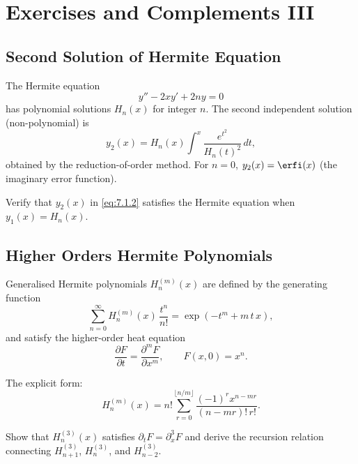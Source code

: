\chapter{Exercises and Complements III}

\section{Second Solution of Hermite Equation}

The Hermite equation
\begin{equation}
y'' - 2xy' + 2ny = 0
\label{eq:7.1.1}
\end{equation}
has polynomial solutions $H_n(x)$ for integer $n$. The second independent
solution (non-polynomial) is
\begin{equation}
y_2(x) = H_n(x)\int^x \frac{e^{t^2}}{H_n(t)^2}\,dt,
\label{eq:7.1.2}
\end{equation}
obtained by the reduction-of-order method. For $n=0$,
$y_2(x)=\erfi(x)$ (the imaginary error function).

\begin{exercise}
Verify that $y_2(x)$ in \eqref{eq:7.1.2} satisfies the Hermite equation
when $y_1(x)=H_n(x)$.
\end{exercise}

\section{Higher Orders Hermite Polynomials}

Generalised Hermite polynomials $H_n^{(m)}(x)$ are defined by the generating
function
\begin{equation}
\sum_{n=0}^{\infty} H_n^{(m)}(x)\,\frac{t^n}{n!}
= \exp\!\left(-t^m + m\,t\,x\right),
\label{eq:7.2.1}
\end{equation}
and satisfy the higher-order heat equation
\begin{equation}
\frac{\partial F}{\partial t} = \frac{\partial^m F}{\partial x^m},
\qquad F(x,0)=x^n.
\label{eq:7.2.2}
\end{equation}

The explicit form:
\begin{equation}
H_n^{(m)}(x) = n!\sum_{r=0}^{\lfloor n/m\rfloor}
\frac{(-1)^r x^{n-mr}}{(n-mr)!\,r!}.
\label{eq:7.2.3}
\end{equation}

\begin{exercise}
Show that $H_n^{(3)}(x)$ satisfies $\partial_t F = \partial_x^3 F$ and derive
the recursion relation connecting $H_{n+1}^{(3)}$, $H_n^{(3)}$, and
$H_{n-2}^{(3)}$.
\end{exercise}


